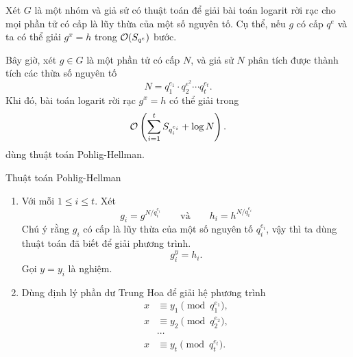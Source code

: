 \begin{frame}
	\begin{thrm}
		Xét $G$ là một nhóm và giả sử có thuật toán để giải bài toán logarit rời rạc cho mọi phần tử có cấp là lũy thừa của một số nguyên tố. Cụ thể, nếu $g$ có cấp $q^e$ và ta có thể giải $g^x = h$ trong $\mathcal{O}(S_{q^e})$ bước.
		\vspace{0.2cm}
		
		Bây giờ, xét $g \in G$ là một phần tử có cấp $N$, và giả sử $N$ phân tích được thành tích các thừa số nguyên tố 
		\[
			N = q_1^{e_1} \cdot q_2^{e^2}\cdots q_t^{e_t}.
		\] 
		Khi đó, bài toán logarit rời rạc $g^x = h$ có thể giải trong 
		\[
			\mathcal{O}\left(\sum_{i=1}^t S_{q_i^{e_i}} + \log N \right).
		\]
		dùng thuật toán Pohlig-Hellman.
	\end{thrm}
\end{frame}

\begin{frame}{Thuật toán Pohlig-Hellman}
\begin{enumerate}
	\item Với mỗi $1 \leq i \leq t$. Xét 
	\[
		g_i = g^{N/q_i^{e_i}} \qquad \text{và}\qquad h_i = h^{N/q_i^{e_i}}
	\]
	Chú ý rằng $g_i$ có cấp là lũy thừa của một số nguyên tố $q_i^{e_i}$, vậy thì ta  dùng thuật toán đã biết để giải  phương trình. 
	\[
		g_i^y = h_i.
	\]
	Gọi $y=y_i$ là nghiệm.
	\item<+-> Dùng định lý phần dư Trung Hoa để giải hệ phương trình 
          \begin{align*}
            x &\equiv y_1 \pmod{q_1^{e_1}},\\
            x &\equiv y_2 \pmod{q_2^{e_2}},\\  
              &\cdots\\ 
            x &\equiv y_t \pmod{q_t^{e_t}}.
          \end{align*}	
\end{enumerate}
\end{frame}

